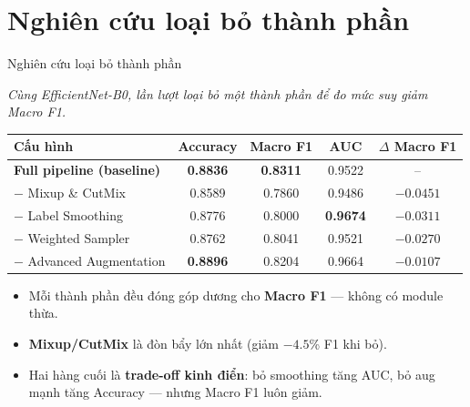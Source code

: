 \documentclass[10pt, aspectratio=169]{beamer}
\renewcommand{\framesubtitle}[1]{%
  \vspace*{-0.3em}\noindent{\large\bfseries\textcolor{usthdark}{#1}}\par\vspace{0.6em}%
}
\begin{document}
\section{Nghiên cứu loại bỏ thành phần}
\begin{frame}{Nghiên cứu loại bỏ thành phần}
    \framesubtitle{Ablation Study --- đóng góp của từng thành phần}
    \scriptsize
    \textit{Cùng EfficientNet-B0, lần lượt loại bỏ một thành phần để đo mức suy giảm Macro F1.}
    \vspace{0.2cm}
    \begin{table}[]
        \centering
        \begin{tabular}{lcccc}
        \toprule
        \rowcolor{usthblue!25}
        \textbf{Cấu hình} & \textbf{Accuracy} & \textbf{Macro F1} & \textbf{AUC} & \textbf{$\Delta$ Macro F1} \\
        \midrule
        \textbf{Full pipeline (baseline)} & \textbf{0.8836} & \textbf{0.8311} & 0.9522 & -- \\
        \midrule
        $-$ Mixup \& CutMix          & 0.8589 & 0.7860 & 0.9486 & \textcolor{usthred}{\textbf{$-0.0451$}} \\
        $-$ Label Smoothing          & 0.8776 & 0.8000 & \textbf{0.9674} & \textcolor{usthred}{$-0.0311$} \\
        $-$ Weighted Sampler         & 0.8762 & 0.8041 & 0.9521 & \textcolor{usthred}{$-0.0270$} \\
        $-$ Advanced Augmentation    & \textbf{0.8896} & 0.8204 & 0.9664 & \textcolor{usthred}{$-0.0107$} \\
        \bottomrule
        \end{tabular}
    \end{table}

    \vspace{0.3cm}
    \footnotesize
    \begin{itemize}
        \item Mỗi thành phần đều đóng góp dương cho \textbf{Macro F1} --- không có module thừa.
        \item \textbf{Mixup/CutMix} là đòn bẩy lớn nhất (giảm $-4.5$\% F1 khi bỏ).
        \item Hai hàng cuối là \textbf{trade-off kinh điển}: bỏ smoothing tăng AUC, bỏ aug mạnh tăng Accuracy --- nhưng Macro F1 luôn giảm.
    \end{itemize}
\end{frame}

\end{document}
